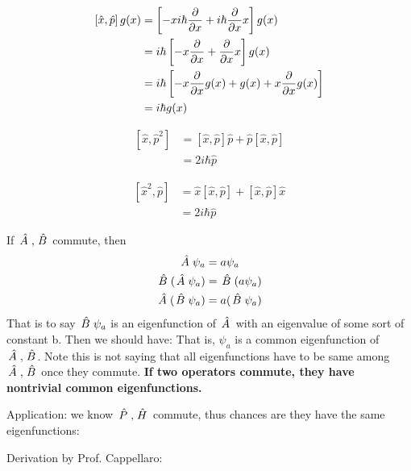 \documentclass{school-22.101-notes}
\begin{document}
\begin{align}
\left[ \hat{x} ,\hat{p} \right] g(x) &= \left[ -x i \hbar \frac{\partial}{\partial x} + i \hbar \frac{\partial}{\partial x} x   \right] g(x) \\
&= i \hbar \left[ -x \frac{\partial}{\partial x} + \frac{\partial}{\partial x} x \right] g(x) \\
&= i \hbar \left[ -x \frac{\partial}{\partial x} g(x) + g(x) + x \frac{\partial}{\partial x} g(x) \right] \\
&= i \hbar g(x)
\end{align}

\begin{align}
\left[ \hat{x} ,\hat{p}^2 \right] 
&= \left[ \hat{x} ,\hat{p} \right] \hat{p} + \hat{p} \left[ \hat{x} ,\hat{p} \right] \\
&= 2 i \hbar \hat{p}
\end{align}


\begin{align}
\left[ \hat{x}^2,\hat{p} \right] 
&= \hat{x} \left[ \hat{x} ,\hat{p} \right]  + \left[ \hat{x} ,\hat{p} \right] \hat{x} \\
&= 2 i \hbar \hat{p}
\end{align}

If $\left. \hat{A} \right., \left. \hat{B} \right.$ commute, then
\begin{align}
\left. \hat{A} \right. \psi_a &= a \psi_a \\
\left. \hat{B} \right. ( \left. \hat{A} \right. \psi_a) &= \left. \hat{B} \right. (a \psi_a ) \\
\left. \hat{A} \right. (\left. \hat{B} \right. \psi_a ) &= a (\left. \hat{B} \right. \psi_a ) 
\end{align}
That is to say $\left. \hat{B} \right. \psi_a$ is an eigenfunction of $\left. \hat{A} \right.$ with an eigenvalue of some sort of constant b. Then we should have:
That is, $\psi_a$ is a common eigenfunction of $\left. \hat{A} \right., \left. \hat{B} \right.$. Note this is not saying that all eigenfunctions have to be same among $\left. \hat{A} \right., \left. \hat{B} \right.$ once they commute. \textbf{If two operators commute, they have nontrivial common eigenfunctions.}

Application: we know $\left. \hat{P} \right., \left. \hat{H} \right.$ commute, thus chances are they have the same eigenfunctions:


Derivation by Prof. Cappellaro: 
\end{document}
